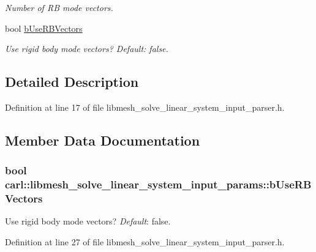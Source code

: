 \begin{DoxyCompactItemize}
\begin{DoxyCompactList}\small\item\em Number of R\+B mode vectors. \end{DoxyCompactList}\item 
bool \hyperlink{structcarl_1_1libmesh__solve__linear__system__input__params_ae381749fcf14eec703f3b5c79febf398}{b\+Use\+R\+B\+Vectors}
\begin{DoxyCompactList}\small\item\em Use rigid body mode vectors? {\itshape Default}\+: {\ttfamily false}. \end{DoxyCompactList}\end{DoxyCompactItemize}


\subsection{Detailed Description}


Definition at line 17 of file libmesh\+\_\+solve\+\_\+linear\+\_\+system\+\_\+input\+\_\+parser.\+h.



\subsection{Member Data Documentation}
\hypertarget{structcarl_1_1libmesh__solve__linear__system__input__params_ae381749fcf14eec703f3b5c79febf398}{}
\subsubsection[{b\+Use\+R\+B\+Vectors}]{\setlength{\rightskip}{0pt plus 5cm}bool carl\+::libmesh\+\_\+solve\+\_\+linear\+\_\+system\+\_\+input\+\_\+params\+::b\+Use\+R\+B\+Vectors}\label{structcarl_1_1libmesh__solve__linear__system__input__params_ae381749fcf14eec703f3b5c79febf398}


Use rigid body mode vectors? {\itshape Default}\+: {\ttfamily false}. 



Definition at line 27 of file libmesh\+\_\+solve\+\_\+linear\+\_\+system\+\_\+input\+\_\+parser.\+h.

